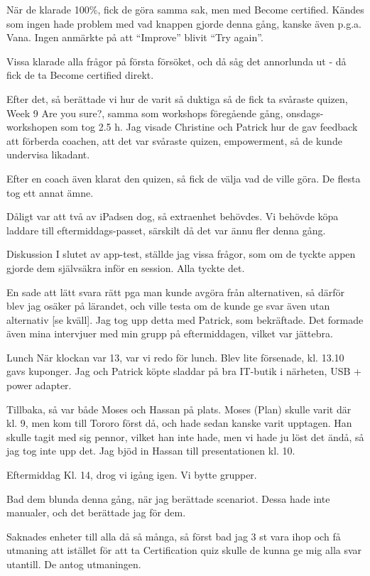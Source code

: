 När de klarade 100\%, fick de göra samma sak, men med Become certified. Kändes som ingen hade problem med vad knappen gjorde denna gång, kanske även p.g.a. Vana. Ingen anmärkte på att “Improve” blivit “Try again”.

Vissa klarade alla frågor på första försöket, och då såg det annorlunda ut - då fick de ta Become certified direkt.

Efter det, så berättade vi hur de varit så duktiga så de fick ta svåraste quizen, Week 9 Are you sure?, samma som workshops föregående gång, onsdags-workshopen som tog 2.5 h. Jag visade Christine och Patrick hur de gav feedback att förberda coachen, att det var svåraste quizen, empowerment, så de kunde undervisa likadant.

Efter en coach även klarat den quizen, så fick de välja vad de ville göra. De flesta tog ett annat ämne.

Dåligt var att två av iPadsen dog, så extraenhet behövdes. Vi behövde köpa laddare till eftermiddags-passet, särskilt då det var ännu fler denna gång.

Diskussion
I slutet av app-test, ställde jag vissa frågor, som om de tyckte appen gjorde dem självsäkra inför en session. Alla tyckte det.

En sade att lätt svara rätt pga man kunde avgöra från alternativen, så därför blev jag osäker på lärandet, och ville testa om de kunde ge svar även utan alternativ [se kväll]. Jag tog upp detta med Patrick, som bekräftade. Det formade även mina intervjuer med min grupp på eftermiddagen, vilket var jättebra.

Lunch
När klockan var 13, var vi redo för lunch. Blev lite försenade, kl. 13.10 gavs kuponger. Jag och Patrick köpte sladdar på bra IT-butik i närheten, USB + power adapter.

Tillbaka, så var både Moses och Hassan på plats. Moses (Plan) skulle varit där kl. 9, men kom till Tororo först då, och hade sedan kanske varit upptagen. Han skulle tagit med sig pennor, vilket han inte hade, men vi hade ju löst det ändå, så jag tog inte upp det. Jag bjöd in Hassan till presentationen kl. 10.

Eftermiddag
Kl. 14, drog vi igång igen. Vi bytte grupper.

Bad dem blunda denna gång, när jag berättade scenariot. Dessa hade inte manualer, och det berättade jag för dem.

Saknades enheter till alla då så många, så först bad jag 3 st vara ihop och få utmaning att istället för att ta Certification quiz skulle de kunna ge mig alla svar utantill. De antog utmaningen.

